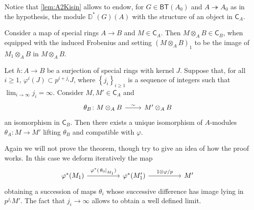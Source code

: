 \begin{rem}[]
	Notice that \cref{lem:A2Kisin} allows to endow,
	for $G \in \mathsf{BT}(A_0)$ and $A \twoheadrightarrow A_0$ as in the hypothesis,
	the module $\mathbb{D}^*(G)(A)$ with the structure of an object in $\mathsf{C}_A$.
\end{rem}


\begin{defn}[]
	Consider a map of special rings $A \to B$ and $M \in \mathsf{C}_A$.
	Then $M \otimes_A B \in \mathsf{C}_B$, when equipped with
	the induced Frobenius %
	and setting
	$\left( M \otimes_A B \right)_1$ to be the image of
	$M_1 \otimes_A B$ in $M \otimes_A B$.
\end{defn}


\begin{lem}\label{lem:A4Kisin}
	Let $h\colon A \to B$ be a surjection of special rings with kernel $J$.
	Suppose that, for all $i \geq 1$, $\varphi^i(J) \subset p^{i + j_i} J$,
	where $\left\{ j_i \right\}_{i \geq 1}$ is a sequence of integers
	such that $\lim_{i \to \infty} j_i = \infty$.
	Consider $M, M' \in \mathsf{C}_A$ and
	\begin{equation*}
	\begin{tikzcd}[row sep = 0ex
		,/tikz/column 1/.append style={anchor=base east}
		,/tikz/column 2/.append style={anchor=base west}]
		\theta_B\colon M \otimes_A B 
		\arrow[r, "\sim", rightarrow] &
		M' \otimes_A B
	\end{tikzcd}
	\end{equation*} 
	an isomorphism in $\mathsf{C}_B$.
	Then there exists a unique isomorphism of $A$-modules
	$\theta_A\colon M \to M'$ lifting $\theta_B$ and compatible with $\varphi$.
\end{lem} 


\begin{rem}[]
	Again we will not prove the theorem, though try to give an idea of
	how the proof works.
	In this case we deform iteratively the map
	\begin{equation*}
	\begin{tikzcd}[column sep=4.8em]
		\varphi^*(M_1) \arrow[r, "\varphi^*(\left.\theta_0\right|_{ M_1 })", rightarrow] &
		\varphi^*(M_1') \arrow[r, "1 \otimes \varphi/p", rightarrow] &
		M'
	\end{tikzcd}
	\end{equation*}
	obtaining a succession of maps $\theta_i$ whose successive difference
	has image lying in $p^{j_i}M'$.
	The fact that $j_i \to \infty$ allows to obtain a well defined limit.
\end{rem}


